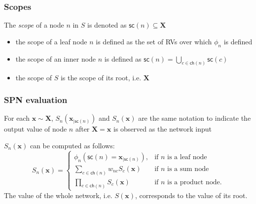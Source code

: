 \documentclass[10pt, t, xcolor={usenames,dvipsnames,svgnames}, compress]{beamer}
\begin{document}
\begin{frame}
  \frametitle{Scopes}
  The \emph{scope} of a node $n$ in $S$ is denoted as
  $\mathsf{sc}(n)\subseteq\mathbf{X}$
\begin{itemize}
\item   the scope of a leaf node $n$ is defined as the set of RVs over which
  $\phi_{n}$ is defined
\item the scope of an inner node $n$ is defined as
  $\mathsf{sc}(n)=\bigcup_{c\in\mathsf{ch}(n)}\mathsf{sc}(c)$
\item the scope of $S$ is the scope of its root, i.e. $\mathbf{X}$
\end{itemize}
\end{frame}

\begin{frame}
\frametitle{SPN evaluation}
  For each $\mathbf{x}\sim \mathbf{X}$,
  $S_{n}(\mathbf{x}_{|\mathsf{sc}(n)})$ and $S_{n}(\mathbf{x})$ are
  the same notation to indicate the output value of node $n$ after
  $\mathbf{X=x}$ is observed as the network input

$S_{n}(\mathbf{x})$ can be computed as follows:
  \begin{equation}
    \label{eq:eval}
    S_{n}(\mathbf{x}) = \begin{cases}
      \phi_{n}( \mathsf{sc}(n) =\mathbf{x}_{|\mathsf{sc}(n)}), & \text{if $n$ is a
        leaf node} \\
      \sum_{c\in \mathsf{ch}(n)}w_{nc}S_{c}(\mathbf{x})& \text{if $n$ is a sum node}\\
      \prod_{c\in \mathsf{ch}(n)}S_{c}(\mathbf{x})& \text{if $n$ is a product node}.
    \end{cases}
  \end{equation}
  The value of the whole network, i.e. $S(\mathbf{x})$, corresponds to
  the value of its root.
\end{frame}
\end{document}
